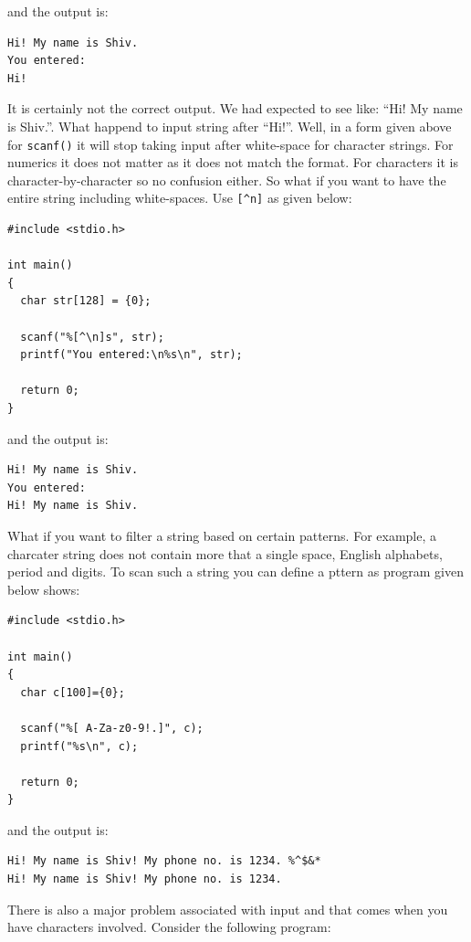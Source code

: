 and the output is:

\begin{Verbatim}[frame=single]
Hi! My name is Shiv.
You entered:
Hi!
\end{Verbatim}

It is certainly not the correct output. We had expected to see like: ``Hi! My
name is Shiv.''. What happend to input string after ``Hi!''. Well, in a form
given above for \texttt{scanf()} it will stop taking input after white-space
for character strings. For numerics it does not matter as it does not match the
format. For characters it is character-by-character so no confusion either. So
what if you want to have the entire string including white-spaces. Use
\texttt{[\^{}n]} as given below:

\begin{Verbatim}[frame=single]
#include <stdio.h>

int main()
{
  char str[128] = {0};

  scanf("%[^\n]s", str);
  printf("You entered:\n%s\n", str);

  return 0;
}
\end{Verbatim}

and the output is:

\begin{Verbatim}[frame=single]
Hi! My name is Shiv.
You entered:
Hi! My name is Shiv.
\end{Verbatim}

What if you want to filter a string based on certain patterns. For example, a
charcater string does not contain more that a single space, English alphabets,
period and digits. To scan such a string you can define a pttern as program
given below shows:

\begin{Verbatim}[frame=single]
#include <stdio.h>

int main()
{
  char c[100]={0};

  scanf("%[ A-Za-z0-9!.]", c);
  printf("%s\n", c);

  return 0;
}
\end{Verbatim}

and the output is:

\begin{Verbatim}[frame=single]
Hi! My name is Shiv! My phone no. is 1234. %^$&*
Hi! My name is Shiv! My phone no. is 1234.
\end{Verbatim}

There is also a major problem associated with input and that comes when you
have characters involved. Consider the following program:

